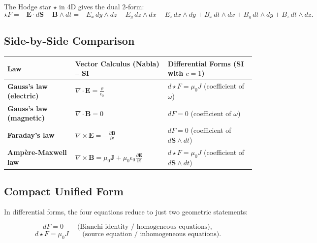 \documentclass[12pt]{article}
\begin{document}
The Hodge star \(\star\) in 4D gives the dual 2-form:
\[
\star F = -\mathbf{E}\cdot d\mathbf{S} + \mathbf{B}\wedge dt 
= -E_x\, dy\wedge dz - E_y\, dz\wedge dx - E_z\, dx\wedge dy
+ B_x\, dt\wedge dx + B_y\, dt\wedge dy + B_z\, dt\wedge dz.
\]

\subsection*{Side-by-Side Comparison}

\begin{table}[!htbp]
	\centering
	\setlength{\tabcolsep}{6pt}
	\begin{tabular}{>{\bfseries}l >{\raggedleft\arraybackslash}p{} >{\raggedright\arraybackslash}p{}}
		\toprule
		\textbf{Law} & \textbf{Vector Calculus (Nabla) -- SI} & \textbf{Differential Forms (SI with \(c=1\))} \\
		\midrule
		Gauss's law (electric) & 
		\( \displaystyle \nabla\cdot\mathbf{E} = \frac{\rho}{\epsilon_0} \) & 
		\( \displaystyle d\star F = \mu_0 J \) (coefficient of \( \omega \)) \\
		\addlinespace
		Gauss's law (magnetic) & 
		\( \displaystyle \nabla\cdot\mathbf{B} = 0 \) & 
		\( \displaystyle dF = 0 \) (coefficient of \( \omega \)) \\
		\addlinespace
		Faraday's law & 
		\( \displaystyle \nabla\times\mathbf{E} = -\frac{\partial\mathbf{B}}{\partial t} \) & 
		\( \displaystyle dF = 0 \) (coefficient of \( d\mathbf{S}\wedge dt \)) \\
		\addlinespace
		Ampère-Maxwell law & 
		\( \displaystyle \nabla\times\mathbf{B} = \mu_0\mathbf{J} + \mu_0\epsilon_0\frac{\partial\mathbf{E}}{\partial t} \) & 
		\( \displaystyle d\star F = \mu_0 J \) (coefficient of \( d\mathbf{S}\wedge dt \)) \\
		\bottomrule
	\end{tabular}
\end{table}

\subsection*{Compact Unified Form}

In differential forms, the four equations reduce to just two geometric statements:

\[
\boxed{dF = 0} \qquad \text{(Bianchi identity / homogeneous equations)},
\]
\[
\boxed{d\star F = \mu_0 J} \qquad \text{(source equation / inhomogeneous equations)}.
\]
\end{document}
